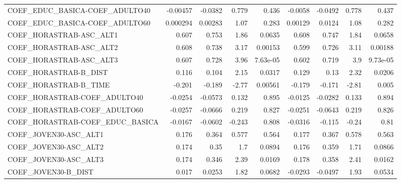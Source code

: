 \begin{tabular}{lrrrrrrrr}
COEF\_EDUC\_BASICA-COEF\_ADULTO40    &    -0.00457 &      -0.0382 &    0.779 &    0.436 &    -0.0058 &     -0.0492 &        0.778 &         0.437 \\
COEF\_EDUC\_BASICA-COEF\_ADULTO60    &    0.000294 &      0.00283 &     1.07 &    0.283 &    0.00129 &      0.0124 &         1.08 &         0.282 \\
COEF\_HORASTRAB-ASC\_ALT1           &       0.607 &        0.753 &     1.86 &   0.0635 &      0.608 &       0.747 &         1.84 &        0.0658 \\
COEF\_HORASTRAB-ASC\_ALT2           &       0.608 &        0.738 &     3.17 &  0.00153 &      0.599 &       0.726 &         3.11 &       0.00188 \\
COEF\_HORASTRAB-ASC\_ALT3           &       0.607 &        0.728 &     3.96 & 7.63e-05 &      0.602 &       0.719 &          3.9 &      9.73e-05 \\
COEF\_HORASTRAB-B\_DIST             &       0.116 &        0.104 &     2.15 &   0.0317 &      0.129 &        0.13 &         2.32 &        0.0206 \\
COEF\_HORASTRAB-B\_TIME             &      -0.201 &       -0.189 &    -2.77 &  0.00561 &     -0.179 &      -0.171 &        -2.81 &         0.005 \\
COEF\_HORASTRAB-COEF\_ADULTO40      &     -0.0254 &      -0.0573 &    0.132 &    0.895 &    -0.0125 &     -0.0282 &        0.133 &         0.894 \\
COEF\_HORASTRAB-COEF\_ADULTO60      &     -0.0257 &      -0.0666 &    0.219 &    0.827 &    -0.0251 &     -0.0643 &        0.219 &         0.826 \\
COEF\_HORASTRAB-COEF\_EDUC\_BASICA   &     -0.0167 &      -0.0602 &   -0.243 &    0.808 &    -0.0316 &      -0.115 &        -0.24 &          0.81 \\
COEF\_JOVEN30-ASC\_ALT1             &       0.176 &        0.364 &    0.577 &    0.564 &      0.177 &       0.367 &        0.578 &         0.563 \\
COEF\_JOVEN30-ASC\_ALT2             &       0.174 &         0.35 &      1.7 &   0.0894 &      0.176 &       0.359 &         1.71 &        0.0866 \\
COEF\_JOVEN30-ASC\_ALT3             &       0.174 &        0.346 &     2.39 &   0.0169 &      0.178 &       0.358 &         2.41 &        0.0162 \\
COEF\_JOVEN30-B\_DIST               &       0.017 &       0.0253 &     1.82 &   0.0682 &    -0.0293 &     -0.0497 &         1.93 &        0.0534 \\

\end{tabular}
